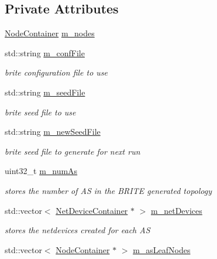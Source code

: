 \subsection*{Private Attributes}
\begin{DoxyCompactItemize}
\item 
\hyperlink{classns3_1_1NodeContainer}{Node\+Container} \hyperlink{classns3_1_1BriteTopologyHelper_aab86f7006d4fa605fddc0bc03d24c8e6}{m\+\_\+nodes}
\item 
std\+::string \hyperlink{classns3_1_1BriteTopologyHelper_afd010e3caf23ed73ec9ff395bcc9a490}{m\+\_\+conf\+File}
\begin{DoxyCompactList}\small\item\em brite configuration file to use \end{DoxyCompactList}\item 
std\+::string \hyperlink{classns3_1_1BriteTopologyHelper_a946a7f28cc74c10675d9874b1ee2fe9b}{m\+\_\+seed\+File}
\begin{DoxyCompactList}\small\item\em brite seed file to use \end{DoxyCompactList}\item 
std\+::string \hyperlink{classns3_1_1BriteTopologyHelper_a80192540d402eb7b3f168e1b7e49915a}{m\+\_\+new\+Seed\+File}
\begin{DoxyCompactList}\small\item\em brite seed file to generate for next run \end{DoxyCompactList}\item 
uint32\+\_\+t \hyperlink{classns3_1_1BriteTopologyHelper_a4dc95255dc0dfeeabd5e2fcd1d31cb13}{m\+\_\+num\+As}
\begin{DoxyCompactList}\small\item\em stores the number of AS in the B\+R\+I\+TE generated topology \end{DoxyCompactList}\item 
std\+::vector$<$ \hyperlink{classns3_1_1NetDeviceContainer}{Net\+Device\+Container} $\ast$ $>$ \hyperlink{classns3_1_1BriteTopologyHelper_a2a59c91c1acf2cc6bb2742d512f570ef}{m\+\_\+net\+Devices}
\begin{DoxyCompactList}\small\item\em stores the netdevices created for each AS \end{DoxyCompactList}\item 
std\+::vector$<$ \hyperlink{classns3_1_1NodeContainer}{Node\+Container} $\ast$ $>$ \hyperlink{classns3_1_1BriteTopologyHelper_a49387c09a7441d773973fd7a21ea8bfc}{m\+\_\+as\+Leaf\+Nodes}

\end{DoxyCompactItemize}
